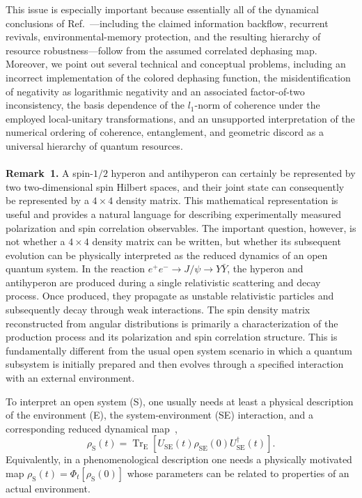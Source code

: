 \documentclass[epjc,twocolumn,nofootinbib,preprintnumbers,amsmath,amssymb]{revtex4-2}
\begin{document}
This issue is especially important because essentially all of the dynamical conclusions of Ref.~\cite{Bachain}---including the claimed information backflow, recurrent revivals, environmental-memory protection, and the resulting hierarchy of resource robustness---follow from the assumed correlated dephasing map. Moreover, we point out several technical and
conceptual problems, including an incorrect implementation of the colored
dephasing function, the misidentification of negativity as logarithmic
negativity and an associated factor-of-two inconsistency, the basis
dependence of the $l_1$-norm of coherence under the employed local-unitary
transformations, and an unsupported interpretation of the numerical ordering
of coherence, entanglement, and geometric discord as a universal hierarchy
of quantum resources.
\\
\\
\textbf{Remark~1.} A spin-$1/2$ hyperon and antihyperon can certainly be represented by two two-dimensional spin Hilbert spaces, and their joint state can consequently be represented by a $4\times4$ density matrix. This mathematical representation is useful and provides a natural language for describing experimentally measured polarization and spin correlation observables.
The important question, however, is not whether a $4\times4$ density matrix can be written, but whether its subsequent evolution can be physically interpreted as the reduced dynamics of an open quantum system.
In the reaction
$e^+e^-\rightarrow J/\psi\rightarrow Y\bar Y$,
the hyperon and antihyperon are produced during a single relativistic scattering and decay process. Once produced, they propagate as unstable relativistic particles and subsequently decay through weak interactions. The spin density matrix reconstructed from angular distributions is primarily a characterization of the production process and its polarization and spin correlation structure. This is fundamentally different from the usual open system scenario in which a quantum subsystem is initially prepared and then evolves through a specified interaction with an external environment.

To interpret an open system (S), one usually needs at least a physical description of the environment (E), the system-environment (SE) interaction, and a corresponding reduced dynamical map~\cite{Breuer},
\begin{equation}
\rho_\mathrm{S}(t)=\operatorname{Tr}_\mathrm{E}
\left[
U_{\mathrm{SE}}(t)\rho_{\mathrm{SE}}(0)U_{\mathrm{SE}}^{\dagger}(t)
\right].
\end{equation}
Equivalently, in a phenomenological description one needs a physically motivated map
$
\rho_\mathrm{S}(t)=\Phi_t[\rho_\mathrm{S}(0)]
$
whose parameters can be related to properties of an actual environment.
\end{document}
